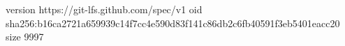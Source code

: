 version https://git-lfs.github.com/spec/v1
oid sha256:b16ca2721a659939c14f7cc4e590d83f141c86db2c6fb40591f3eb5401eacc20
size 9997
